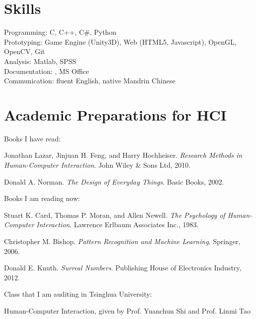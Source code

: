 \documentclass[margin,line]{resume}
\begin{document}
\begin{resume}
    \section{\mysidestyle Skills} 
    
    Programming: C, C++, C\#, Python \\
    Prototyping: Game Engine (Unity3D), Web (HTML5, Javascript), OpenGL, OpenCV, Git\\
    Analysis: Matlab, SPSS \\
    Documentation: \LaTeXe, MS Office \\
    Communication: fluent English, native Mandrin Chinese



    \section{\mysidestyle Academic Preparations for HCI} 
    
    Books I have read: 
    \begin{list2}
        \item Jonathan Lazar, Jinjuan H. Feng, and Harry Hochheiser. \textsl{Research Methods in Human-Computer Interaction}. John Wiley \& Sons Ltd, 2010.
	\item Donald A. Norman. \textsl{The Design of Everyday Things}. Basic Books, 2002.     
    \end{list2}
    \vspace{-3mm}
    Books I am reading now:
    \begin{list2}
   	\item Stuart K. Card, Thomas P. Moran, and Allen Newell. \textsl{The Psychology of Human-Computer Interaction}. Lawrence Erlbaum Associates Inc., 1983.
	 \item Christopher M. Bishop. \emph{Pattern Recognition and Machine Learning}. Springer, 2006.
	 \item Donald E. Knuth. \emph{Surreal Numbers}. Publishing House of Electronics Industry, 2012.
    \end{list2}
        
    Class that I am auditing in Tsinghua University:
    \begin{list2}
    \item Human-Computer Interaction, given by Prof. Yuanchun Shi and Prof. Linmi Tao
    \end{list2}
    

\end{resume}
\end{document}
